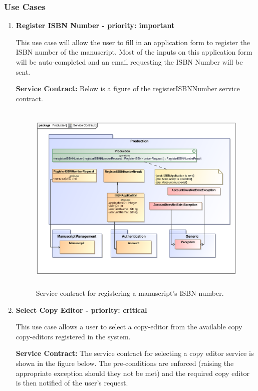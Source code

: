 \subsubsection{Use Cases}
\begin{enumerate}
\item \textbf{Register ISBN Number - priority: important}

\par{This use case will allow the user to fill in an application form to register the ISBN number of the manuscript. Most of the inputs on this application form will be auto-completed and an email requesting the ISBN Number will be sent.}

\textbf{Service Contract:} 
Below is a figure of the registerISBNNumber service contract.

\begin{figure}[h]
\includegraphics[height=350px, width=500px]{epsImages/Production/RegisterISBNNumber.eps}
\caption{Service contract for registering a manuscript's ISBN number.}
\end{figure}

\newpage
\item \textbf{Select Copy Editor - priority: critical}\\

\par{This use case allows a user to select a copy-editor from the available copy copy-editors registered in the system.}

\textbf{Service Contract:} 
The service contract for selecting a copy editor service is shown in the figure below. The pre-conditions are enforced (raising the appropriate exception should they not be met) and the required copy editor is then notified of the user's request.


\end{enumerate}
